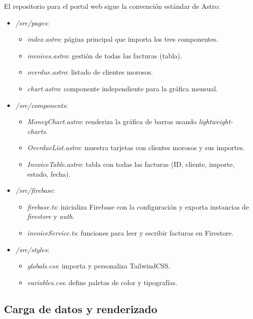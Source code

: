\begin{large}

El repositorio para el portal web sigue la convención estándar de Astro:
\begin{itemize}
  \item \textit{/src/pages}:
    \begin{itemize}
      \item \textit{index.astro}: página principal que importa los tres componentes.
      \item \textit{invoices.astro}: gestión de todas las facturas (tabla).
      \item \textit{overdue.astro}: listado de clientes morosos.
      \item \textit{chart.astro}: componente independiente para la gráfica mensual.
    \end{itemize}
  \item \textit{/src/components}:
    \begin{itemize}
      \item \textit{MoneyChart.astro}: renderiza la gráfica de barras usando \emph{lightweight-charts}.
      \item \textit{OverdueList.astro}: muestra tarjetas con clientes morosos y sus importes.
      \item \textit{InvoiceTable.astro}: tabla con todas las facturas (ID, cliente, importe, estado, fecha).
    \end{itemize}
  \item \textit{/src/firebase}:
    \begin{itemize}
      \item \textit{firebase.ts}: inicializa Firebase con la configuración y exporta instancias de \textit{firestore} y \textit{auth}.
      \item \textit{invoiceService.ts}: funciones para leer y escribir facturas en Firestore.
    \end{itemize}
  \item \textit{/src/styles}:
    \begin{itemize}
      \item \textit{globals.css}: importa y personaliza TailwindCSS.
      \item \textit{variables.css}: define paletas de color y tipografías.
    \end{itemize}
\end{itemize}

\end{large}

\subsection{Carga de datos y renderizado}

